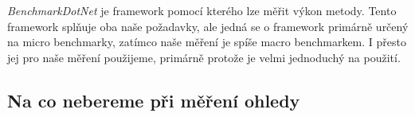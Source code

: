 \textit{BenchmarkDotNet} je framework pomocí kterého lze měřit výkon metody. Tento framework splňuje oba naše požadavky, ale jedná se o framework primárně určený na micro benchmarky, zatímco naše měření je spíše macro benchmarkem. I přesto jej pro naše měření použijeme, primárně protože je velmi jednoduchý na použití.

\subsection{Na co nebereme při měření ohledy}


































